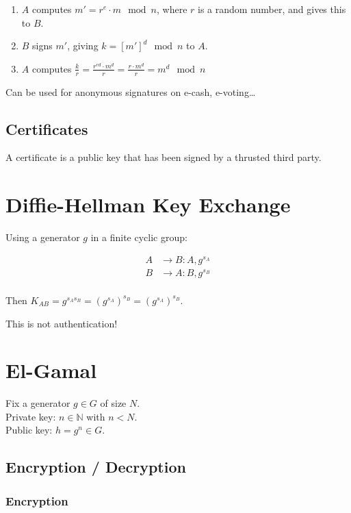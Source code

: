 \documentclass{article}
\begin{document}
\begin{enumerate}
  \item $A$ computes $m' = r^e \cdot m \mod n$, where $r$ is a random number, and gives
    this to $B$.
  \item $B$ signs $m'$, giving $k = [m']^d \mod n$ to $A$.
  \item $A$ computes $\frac{k}{r} = \frac{r^{ed} \cdot m^d}{r} = \frac{r \cdot m^d}{r} = m^d \mod n$
\end{enumerate}

Can be used for anonymous signatures on e-cash, e-voting\dots

\subsection{Certificates}
A certificate is a public key that has been signed by a thrusted third party.

\section{Diffie-Hellman Key Exchange}

Using a generator $g$ in a finite cyclic group:

\begin{align*}
  A &\longrightarrow B: A, g^{s_A} \\
  B &\longrightarrow A: B, g^{s_B} \\
\end{align*}

Then $K_{AB} = g^{s_A s_B} = (g^{s_A})^{s_B} = (g^{s_A})^{s_B}$.

This is not authentication!

\section{El-Gamal}
Fix a generator $g \in G$ of size $N$. \\
Private key: $n \in \mathbb{N}$ with $n < N$. \\
Public key: $h = g^n \in G$.

\subsection{Encryption / Decryption}
\subsubsection{Encryption}
\end{document}
